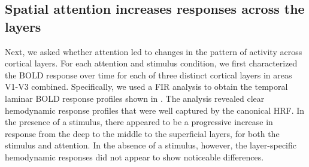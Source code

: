 \documentclass[9pt,lineno]{aperture}
\begin{document}
\subsection{Spatial attention increases responses across the layers}
Next, we asked whether attention led to changes in the pattern of activity across cortical layers. For each attention and stimulus condition, we first characterized the BOLD response over time for each of three distinct cortical layers in areas V1-V3 combined. Specifically, we used a FIR analysis to obtain the temporal laminar BOLD response profiles shown in . The analysis revealed clear hemodynamic response profiles that were well captured by the canonical HRF. In the presence of a stimulus, there appeared to be a progressive increase in response from the deep to the middle to the superficial layers, for both the stimulus and attention. In the absence of a stimulus, however, the layer-specific hemodynamic responses did not appear to show noticeable differences.
\end{document}
